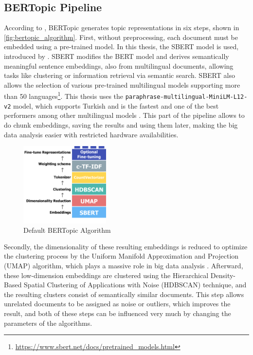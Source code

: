 \subsection{BERTopic Pipeline}\label{chapter:bertopic_pipeline}

According to \textcite{bertopic}, BERTopic generates topic representations in six steps,
shown in \autoref{fig:bertopic_algorithm}. 
First, without preprocessing, each document must be embedded using a pre-trained model. 
In this thesis, the SBERT model is used, introduced by \textcite{sentence-bert}. 
SBERT modifies the BERT model and derives semantically meaningful sentence embeddings, 
also from multilingual documents, allowing tasks like clustering or information retrieval 
via semantic search. SBERT also allows the selection of various pre-trained multilingual 
models supporting more than 50 languages\footnote{\url{https://www.sbert.net/docs/pretrained_models.html}}. 
This thesis uses the \texttt{paraphrase-multilingual-MiniLM-L12-v2} model, which supports 
Turkish and is the fastest and one of the best performers among other multilingual models 
\parencite{reimers_sbert_multilingual_2020}. This part of the pipeline allows to do 
chunk embeddings, saving the results and using them later, making the big data analysis 
easier with restricted hardware availabilities.

\begin{figure}
    \centering
    \includegraphics[width=0.4\textwidth]{figures/bertopic_algorithm.png}
    \caption[Default BERTopic Algorithm]
    {Default BERTopic Algorithm\footnotemark}\label{fig:bertopic_algorithm}
\end{figure}

Secondly, the dimensionality of these resulting embeddings is reduced to optimize the 
clustering process by the Uniform Manifold Approximation and Projection (UMAP) algorithm, 
which plays a massive role in big data analysis \parencite{mcinnes_umap_2020}. 
Afterward, these low-dimension embeddings are clustered using the Hierarchical Density-Based 
Spatial Clustering of Applications with Noise (HDBSCAN) technique, and the resulting 
clusters consist of semantically similar documents. This step allows unrelated documents 
to be assigned as noise or outliers, which improves the result, and both of these 
steps can be influenced very much by changing the parameters of the algorithms.

